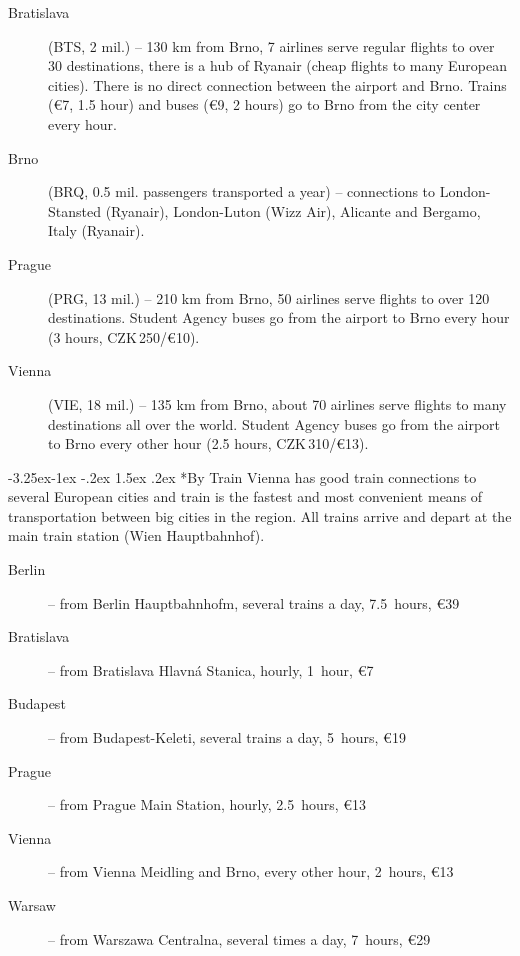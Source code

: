 \documentclass[10pt,a4paper]{article}
\makeatletter
\renewcommand\subsubsection{%
\@startsection{subsubsection}{2}{\z@}%
              {-3.25ex\@plus -1ex \@minus -.2ex}%
              {1.5ex \@plus .2ex}%
              {\color{kdedarker}\sffamily\large\bfseries}}
\makeatother
\begin{document}
\begin{description}
\item[\color{kdedarker} Bratislava] (BTS, 2 mil.) -- 130 km from Brno, 7 airlines serve
regular flights to over 30 destinations, there is a hub of Ryanair
(cheap flights to many European cities). There is no direct connection
between the airport and Brno. Trains (\euro{7}, 1.5 hour) and buses
(\euro{9}, 2 hours) go to Brno from the city center every hour.
\item[\color{kdedarker} Brno] (BRQ, 0.5 mil. passengers transported a year) -- 
connections to London-Stansted (Ryanair), London-Luton (Wizz Air),
Alicante and Bergamo, Italy (Ryanair).
\item[\color{kdedarker} Prague] (PRG, 13 mil.) -- 210 km from Brno, 50 airlines serve flights to over 120 destinations. Student Agency buses go from the airport to Brno every hour (3 hours, CZK\,250/\euro{10}).
\item[\color{kdedarker} Vienna] (VIE, 18 mil.) -- 135 km from Brno, about 70 airlines serve flights to many destinations all over the world. Student Agency buses go from the airport to Brno every other hour
(2.5 hours, CZK\,310/\euro{13}).
\end{description}

\subsubsection*{By Train}
Vienna has good train connections to several European cities and train is the fastest and most convenient
means of transportation between big cities in the region. All trains arrive and depart at the main train
station (Wien Hauptbahnhof).

\begin{description}
\item[\color{kdedarker} Berlin] -- from Berlin Hauptbahnhofm, several trains a day, 7.5~hours, \euro{39}
\item[\color{kdedarker} Bratislava] -- from Bratislava Hlavná Stanica, hourly, 1~hour, \euro{7}
\item[\color{kdedarker} Budapest] -- from Budapest-Keleti, several trains a day, 5~hours, \euro{19}
\item[\color{kdedarker} Prague] -- from Prague Main Station, hourly, 2.5~hours, \euro{13}
\item[\color{kdedarker} Vienna] -- from Vienna Meidling and Brno, every other hour, 2~hours, \euro{13}
\item[\color{kdedarker} Warsaw] -- from Warszawa Centralna, several times a day, 7~hours, \euro{29}
\end{description}
\end{document}

